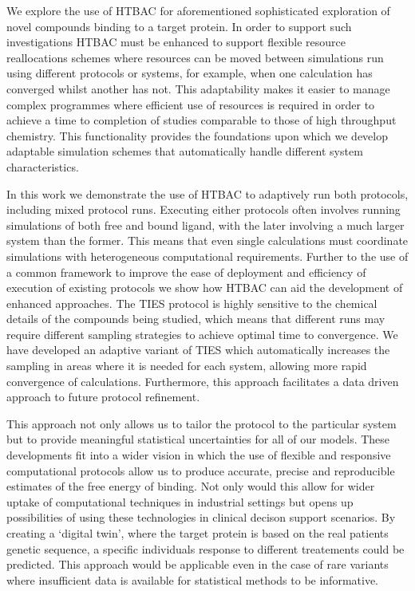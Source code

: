 We explore the use of HTBAC for aforementioned sophisticated
exploration of novel compounds binding to a target protein.
In order to support such investigations HTBAC must be enhanced to support
flexible resource reallocations schemes where resources can be moved between
simulations run using different protocols or systems, for example, when one
calculation has converged whilst another has not. This adaptability makes it
easier to manage complex programmes where efficient use of resources is
required in order to achieve a time to completion of studies comparable to
those of high throughput chemistry. This functionality provides the
foundations upon which we develop adaptable simulation schemes 
that automatically handle different system characteristics.

In this work we demonstrate the use of HTBAC to adaptively run both protocols,
including mixed protocol runs. 
Executing either protocols often involves running simulations of both free and  bound  ligand, with the later involving a much larger system than the former.
This means that even single calculations must coordinate simulations with 
heterogeneous computational requirements.
Further to the use of a common framework to improve the ease of deployment and
efficiency of execution of existing protocols we show how HTBAC can aid the
development of enhanced approaches. 
The TIES protocol is highly sensitive to the chemical details of the compounds being studied, which means that different runs may require different sampling strategies to achieve optimal time to convergence. 
We have developed an adaptive variant of TIES which automatically increases the sampling in areas where it is needed for each system, allowing more rapid convergence of calculations. 
Furthermore, this approach facilitates a data driven approach to future
protocol refinement.

This approach not only allows us to tailor the protocol to the particular system but to provide meaningful statistical uncertainties for all of our models.
These developments fit into a wider vision in which the use of flexible and 
responsive computational protocols allow us to produce accurate, precise and 
reproducible estimates of the free energy of binding.
Not only would this allow for wider uptake of computational techniques in industrial settings but opens up possibilities of using these technologies 
in clinical decison support scenarios.
By creating a `digital twin', where the target protein is based on the real patients genetic sequence, a specific individuals response to different treatements could be predicted.
This approach would be applicable even in the case of rare variants where insufficient data is available for statistical methods to be informative.

